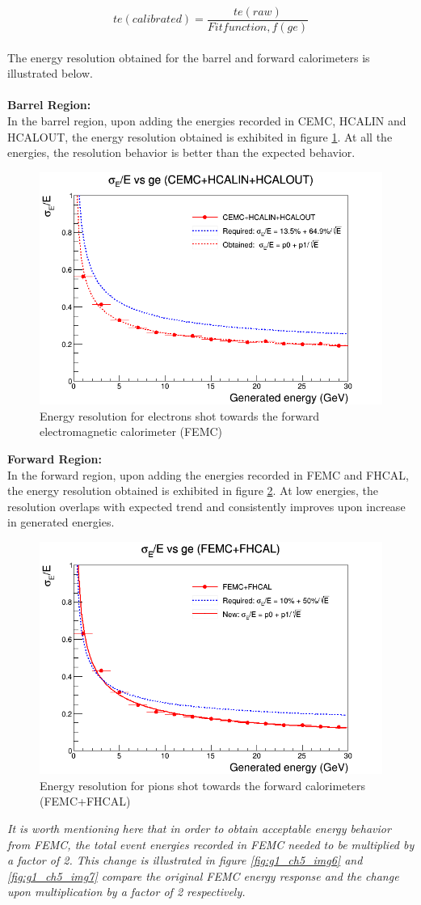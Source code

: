 $$ te(calibrated) = \frac{te(raw)}{Fit function, f(ge)} $$
\\
The energy resolution obtained for the barrel and forward  calorimeters is illustrated below.\\
\\
\textbf{Barrel Region:}\\
In the barrel region, upon adding the energies recorded in CEMC, HCALIN and HCALOUT, the energy resolution obtained is exhibited in figure \ref{fig:g1_ch5_img4}. At all the energies, the resolution behavior is better than the expected behavior.
\begin{figure}[H]
        \centering  
		\includegraphics[width=0.5\linewidth]{group1/Resolution_CEMC_HCALIN_HCALOUT.png}
		\caption{Energy resolution for electrons shot towards the forward electromagnetic calorimeter (FEMC)}
		\label{fig:g1_ch5_img4}
\end{figure}
\textbf{Forward Region:}\\
In the forward region, upon adding the energies recorded in FEMC and FHCAL, the energy resolution obtained is exhibited in figure \ref{fig:g1_ch5_img5}. At low energies, the resolution overlaps with expected trend and consistently improves upon increase in generated energies.
\begin{figure}[H]
        \centering  
		\includegraphics[width=0.5\linewidth]{group1/Resolution_FEMC_FHCAL.png}
		\caption{Energy resolution for pions shot towards the forward calorimeters (FEMC+FHCAL)}
		\label{fig:g1_ch5_img5}
\end{figure}
\textit{It is worth mentioning here that in order to obtain acceptable energy behavior from FEMC, the total event energies recorded in FEMC needed to be multiplied by a factor of 2. This change is illustrated in figure \ref{fig:g1_ch5_img6} and \ref{fig:g1_ch5_img7} compare the original FEMC energy response and the change upon multiplication by a factor of 2 respectively.  }
